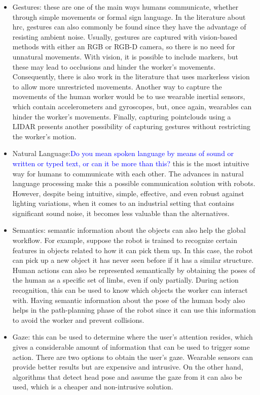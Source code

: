 \begin{itemize}
\item Gestures: these are one of the main ways humans communicate, whether through simple movements or formal sign language. In the literature about \acs{hrc}, gestures can also commonly be found since they have the advantage of resisting ambient noise. Usually, gestures are captured with vision-based methods with either an RGB or RGB-D camera, so there is no need for unnatural movements. With vision, it is possible to include markers, but these may lead to occlusions and hinder the worker's movements. Consequently, there is also work in the literature that uses markerless vision to allow more unrestricted movements. Another way to capture the movements of the human worker would be to use wearable inertial sensors, which contain accelerometers and gyroscopes, but, once again, wearables can hinder the worker's movements. Finally, capturing pointclouds using a LIDAR presents another possibility of capturing gestures without restricting the worker's motion.

\item Natural Language:\textcolor{blue}{Do you mean spoken language by means of sound or written or typed text, or can it be more than this?} this is the most intuitive way for humans to communicate with each other. The advances in natural language processing make this a possible communication solution with robots. However, despite being intuitive, simple, effective, and even robust against lighting variations, when it comes to an industrial setting that contains significant sound noise, it becomes less valuable than the alternatives.

\item Semantics: semantic information about the objects can also help the global workflow. For example, suppose the robot is trained to recognize certain features in objects related to how it can pick them up. In this case, the robot can pick up a new object it has never seen before if it has a similar structure. Human actions can also be represented semantically by obtaining the poses of the human as a specific set of limbs, even if only partially. During action recognition, this can be used to know which objects the worker can interact with. Having semantic information about the pose of the human body also helps in the path-planning phase of the robot since it can use this information to avoid the worker and prevent collisions.

\item Gaze: this can be used to determine where the user's attention resides, which gives a considerable amount of information that can be used to trigger some action. There are two options to obtain the user's gaze. Wearable sensors can provide better results but are expensive and intrusive. On the other hand, algorithms that detect head pose and assume the gaze from it can also be used, which is a cheaper and non-intrusive solution.


\end{itemize}
